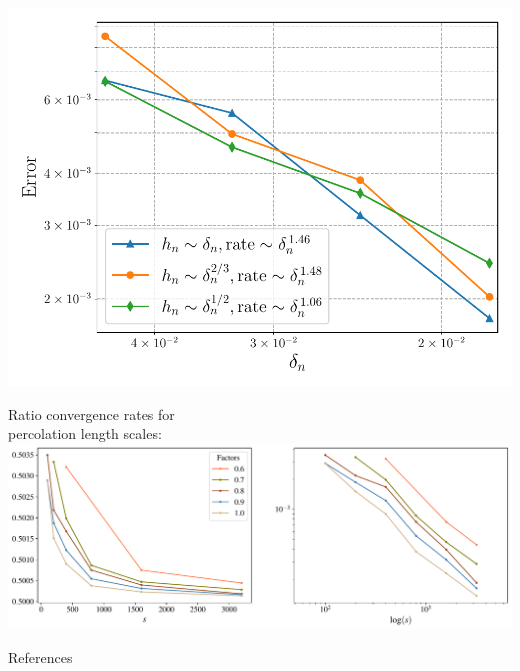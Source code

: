 \begin{minipage}[b][\midHeight][t]{.31\textwidth}
\begin{minipage}{.32\textwidth}
\includegraphics[width=\textwidth]{atelier/aronsson_star_singular_plot}
\end{minipage}%
%
\hfill%
%
\begin{minipage}{.65\textwidth}%
\small
Ratio convergence rates for\\percolation length scales:
\centering
\includegraphics[width=\textwidth]{atelier/ratio_convergence_3d}%
\end{minipage}%
%
{\color{BaseDarkColor} References}
\AtNextBibliography{\tiny}%
\printbibliography[heading=none]


\end{minipage}